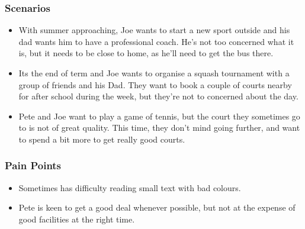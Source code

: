 
\subsubsection*{Scenarios}
\label{ssub:child_scenarios}

\begin{itemize}
	\item With summer approaching, Joe wants to start a new sport outside and
		his dad wants him to have a professional coach. He's not too concerned
		what it is, but it needs to be close to home, as he'll need to get the
		bus there.

	\item Its the end of term and Joe wants to organise a squash tournament
		with a group of friends and his Dad. They want to book a couple of
		courts nearby for after school during the week, but they're not to
		concerned about the day.

	\item Pete and Joe want to play a game of tennis, but the court they
		sometimes go to is not of great quality. This time, they don't mind
		going further, and want to spend a bit more to get really good courts.
\end{itemize}


\subsubsection*{Pain Points}
\label{ssub:child_pain_points}

\begin{itemize}
	\item Sometimes has difficulty reading small text with bad colours.
	\item Pete is keen to get a good deal whenever possible, but not at the
		expense of good facilities at the right time.
\end{itemize}

